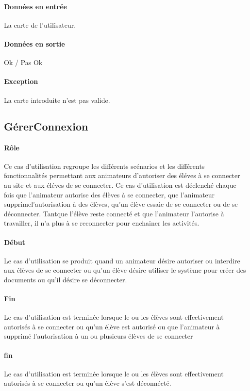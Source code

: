 \documentclass{article}
\begin{document}
		\paragraph{Données en entrée}
			La carte de l'utilisateur.
		\paragraph{Données en sortie}
			Ok / Pas Ok
		\paragraph{Exception}
			La carte introduite n'est pas valide. 
	\subsection{GérerConnexion}
		\paragraph{Rôle}
			Ce cas d'utilisation regroupe les différents scénarios et les différents fonctionnalités 
			permettant aux animateurs d'autoriser des éléves à se connecter au site et aux éléves
			de se connecter. Ce cas d'utilisation est déclenché chaque fois que l'animateur autorise
			des élèves à se connecter, que l'animateur supprimel'autorisation à des élèves, qu'un élève
			essaie de se connecter ou de se déconnecter. Tantque l'élève reste connecté et que l'animateur
			l'autorise à travailler, il n'a plus à se reconnecter pour enchainer les activités.
		\paragraph{Début}
			Le cas d'utilisation se produit quand un animateur désire autoriser ou interdire aux élèves
			de se connecter ou qu'un élève désire utiliser le système pour créer des documents ou qu'il
			désire se déconnecter. 
		\paragraph{Fin}
			Le cas d'utilisation est terminée lorsque le ou les élèves sont effectivement autorisés
			à se connecter ou qu'un élève est autorisé ou que l'animateur à supprimé l'autorisation
			à un ou plusieurs élèves de se connecter\paragraph{fin}
			Le cas d'utilisation est terminée lorsque le ou les élèves sont effectivement autorisés 
			à se connecter ou qu'un élève s'est déconnécté. 
\end{document}
